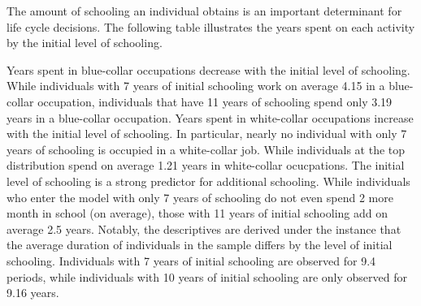 The amount of schooling an individual obtains is an important determinant for life cycle decisions. The following table illustrates the years spent on each activity by the initial level of schooling.

Years spent in blue-collar occupations decrease with the initial level of schooling. While individuals with 7 years of initial schooling work on average 4.15 in a blue-collar occupation, individuals that have 11 years of schooling spend only 3.19 years in a blue-collar occupation. Years spent in white-collar occupations increase with the initial level of schooling. In particular, nearly no individual with only 7 years of schooling is occupied in a white-collar job. While individuals at the top distribution spend on average 1.21 years in white-collar ocucpations. The initial level of schooling is a strong predictor for additional schooling. While individuals who enter the model with only 7 years of schooling do not even spend 2 more month in school (on average), those with 11 years of initial schooling add on average 2.5 years. Notably, the descriptives are derived under the instance that the average duration of individuals in the sample differs by the level of initial schooling. Individuals with 7 years of initial schooling are observed for 9.4 periods, while individuals with 10 years of initial schooling are only observed for 9.16 years.

\newpage
